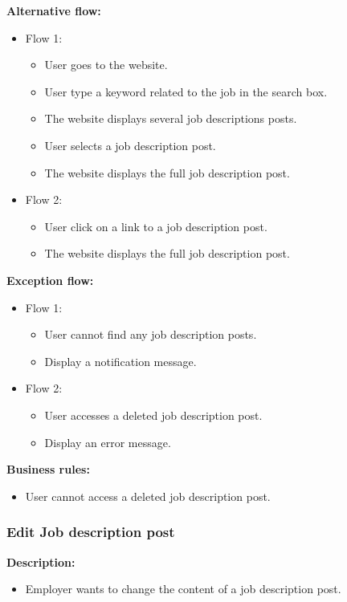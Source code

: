 \documentclass[a4paper]{article}
\begin{document}
\textbf{Alternative flow:}
\begin{itemize}
    \item Flow 1:
          \begin{itemize}
              \item User goes to the website.
              \item User type a keyword related to the job in the search box.
              \item The website displays several job descriptions posts.
              \item User selects a job description post.
              \item The website displays the full job description post.
          \end{itemize}
    \item Flow 2:
          \begin{itemize}
              \item User click on a link to a job description post.
              \item The website displays the full job description post.
          \end{itemize}
\end{itemize}

\textbf{Exception flow:}
\begin{itemize}
    \item Flow 1:
          \begin{itemize}
              \item User cannot find any job description posts.
              \item Display a notification message.
          \end{itemize}
    \item Flow 2:
          \begin{itemize}
              \item User accesses a deleted job description post.
              \item Display an error message.
          \end{itemize}
\end{itemize}

\textbf{Business rules:}
\begin{itemize}
    \item User cannot access a deleted job description post.
\end{itemize}

\subsubsection{Edit Job description post}
\textbf{Description:}
\begin{itemize}
    \item Employer wants to change the content of a job description post.
\end{itemize}
\end{document}
